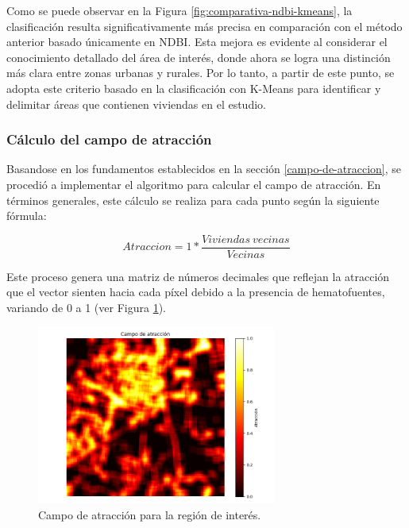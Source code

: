 Como se puede observar en la Figura \ref{fig:comparativa-ndbi-kmeans}, la clasificación resulta significativamente más precisa en comparación con el método anterior basado únicamente en NDBI. Esta mejora es evidente al considerar el conocimiento detallado del área de interés, donde ahora se logra una distinción más clara entre zonas urbanas y rurales. Por lo tanto, a partir de este punto, se adopta este criterio basado en la clasificación con K-Means para identificar y delimitar áreas que contienen viviendas en el estudio.

\subsubsection{Cálculo del campo de atracción}

Basandose en los fundamentos establecidos en la sección \ref{campo-de-atraccion}, se procedió a implementar el algoritmo para calcular el campo de atracción. En términos generales, este cálculo se realiza para cada punto según la siguiente fórmula:

$$Atraccion = 1 * \frac{Viviendas~vecinas}{Vecinas}$$

Este proceso genera una matriz de números decimales que reflejan la atracción que el vector sienten hacia cada píxel debido a la presencia de hematofuentes, variando de 0 a 1 (ver Figura \ref{fig:atraccion}).

\begin{figure}[H]
	\includegraphics[width=0.7\textwidth]{campoDeAtraccion.png}
	\centering
	\caption{Campo de atracción para la región de interés.}
	\label{fig:atraccion}
\end{figure}


